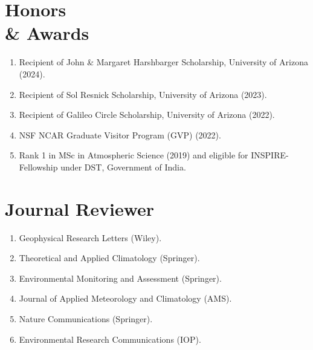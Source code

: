 \documentclass[margin,line]{resume}
\begin{document}
\begin{resume}
			\vspace*{-3mm}
			
			\section{\mysidestyle \textbf{\textcolor{sep}{Honors \\\& Awards}}}
			\begin{enumerate}[topsep=0.1pt, partopsep=1pt, itemsep=0.1pt, parsep=0.1pt, leftmargin=12pt,label=\roman{*})]
				\item Recipient of John \& Margaret Harshbarger Scholarship, University of Arizona (2024).
				\item Recipient of Sol Resnick Scholarship, University of Arizona (2023).
				\item Recipient of Galileo Circle Scholarship, University of Arizona (2022).
				\item NSF NCAR Graduate Visitor Program (GVP) (2022).
				\item Rank 1 in MSc in Atmospheric Science (2019) and eligible for INSPIRE-Fellowship under DST, Government of India.
				
			\end{enumerate} 
			\vspace*{-3mm}
			
			\section{\mysidestyle \textbf{\textcolor{sep}{Journal Reviewer}}}
			\begin{enumerate}[topsep=0.1pt, partopsep=1pt, itemsep=0.1pt, parsep=0.1pt, leftmargin=12pt,label=\roman{*})]
				\item Geophysical Research Letters (Wiley).
				\item Theoretical and Applied Climatology (Springer).
				\item Environmental Monitoring and Assessment (Springer).
				\item 
				Journal of Applied Meteorology and Climatology (AMS).
				\item Nature Communications (Springer).
				\item Environmental Research Communications (IOP).
				

\end{enumerate}
\end{resume}
\end{document}
